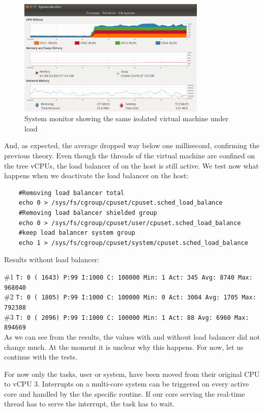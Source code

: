 \documentclass[]{scrartcl}
\begin{document}
\begin{figure}[t]
	\centering
	\includegraphics[width=0.8\textwidth]{test-cpuload}
	\caption{System monitor showing the same isolated virtual machine under load}
	\label{fig:test-cpuload}
\end{figure}

And, as expected, the average dropped way below one millisecond, confirming the previous theory.
Even though the threads of the virtual machine are confined on the tree vCPUs, the load balancer of on the host is still active. We test now what happens when we deactivate the load balancer on the host:

\begin{verbatim}
	#Removing load balancer total
	echo 0 > /sys/fs/cgroup/cpuset/cpuset.sched_load_balance
	#Removing load balancer shielded group
	echo 0 > /sys/fs/cgroup/cpuset/user/cpuset.sched_load_balance
	#keep load balancer system group
	echo 1 > /sys/fs/cgroup/cpuset/system/cpuset.sched_load_balance
\end{verbatim}

\noindent Results without load balancer:

\noindent \small \#1 \texttt{T: 0 ( 1643) P:99 I:1000 C: 100000 Min: 1 Act:  345 Avg: 8740 Max:  968040}\\
\noindent \small \#2 \texttt{T: 0 ( 1805) P:99 I:1000 C: 100000 Min: 0 Act: 3004 Avg: 1705 Max:  792388}\\
\noindent \small \#3 \texttt{T: 0 ( 2096) P:99 I:1000 C: 100000 Min: 1 Act:   88 Avg: 6960 Max:  894669}\\

As we can see from the results, the values with and without load balancer did not change much.
At the moment it is unclear why this happens. For now, let us continue with the tests.

For now only the tasks, user or system, have been moved from their original CPU to vCPU 3. 
Interrupts on a multi-core system can be triggered on every active core and handled by the the specific routine. If our core serving the real-time thread has to serve the interrupt, the task has to wait.
\end{document}
